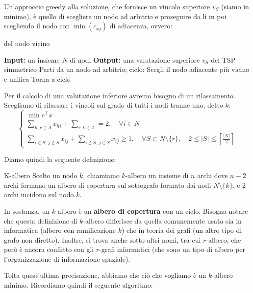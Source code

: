 \documentclass[a4paper,11pt]{article}
\begin{document}
Un'approccio greedy alla soluzione, che fornisce un vincolo superiore $v_S$ (siamo in minimo), è quello di scegliere un nodo ad arbitrio e proseguire da lì in poi scegliendo il nodo con $\min(c_{xj})$ di adiacenza, ovvero:

\begin{algorithm}[H]
\caption{del nodo vicino}
\begin{algorithmic}
	\STATE \textbf{Input:} un insieme $N$ di nodi %
	\STATE \textbf{Output:} una valutazione superiore $v_S$ del TSP simmetrico %
	\STATE Parti da un nodo ad arbitrio;
	\STATE \textsf{ciclo:}
	\STATE Scegli il nodo adiacente più vicino e unifica
	\STATE Torna a \textsf{ciclo}
	\ENDIF
\end{algorithmic}
\end{algorithm}

Per il calcolo di una valutazione inferiore avremo bisogno di un rilassamento.
Scegliamo di rilassare i vincoli sul grado di tutti i nodi tranne uno, detto $k$: 
\[
	\begin{cases}
		\min c^\intercal x \\ 
		\sum\limits_{h,r \in A} x_{hi} + \sum\limits_{r,k \in A} = 2, \quad \forall i \in N \\
		\sum\limits_{i \in S, \, j \notin S} x_{ij} + \sum\limits_{i \notin S, \, j \in S} x_{ij} \geq 1, \quad \forall S \subset N \setminus \{r\}, \quad 2 \leq |S| \leq \left\lceil \frac{|N|}{2} \right\rceil
	\end{cases}
\]

Diamo quindi la seguente definizione:
\begin{definition}{K-albero}
	Scelto un nodo $k$, chiamiamo $k$-albero un insieme di $n$ archi dove $n-2$ archi formano un albero di copertura sul sottografo formato dai nodi $N \setminus \{k\}$, e 2 archi incidono sul nodo $k$.	
\end{definition}
In sostanza, un $k$-albero è un \textbf{albero di copertura} con un ciclo.
Bisogna notare che questa definizione di $k$-albero differisce da quella comunemente usata sia in informatica (albero con ramificazione $k$) che in teoria dei grafi (un altro tipo di grafo non diretto).
Inoltre, si trova anche sotto altri nomi, tra cui $r$-albero, che però è ancora conflitto con gli $r$-grafi informatici (che sono un tipo di albero per l'organizzazione di informazione spaziale).

Tolta quest'ultima precisazione, abbiamo che ciò che vogliamo è un $k$-albero minimo.
Ricordiamo quindi il seguente algoritmo:
\end{document}
